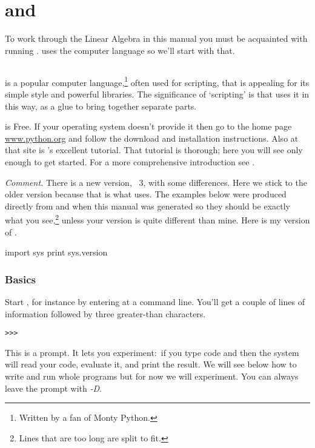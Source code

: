 \chapter{\python{} and \Sage{}}

To work through the Linear Algebra in this manual
you must be acquainted with running \Sage. 
\Sage{} uses the computer language \python{} so we'll start with that.


\section{\python}
\python{} is a popular computer language,\footnote{Written by a fan of
Monty Python.} often used for scripting,
that is appealing for its simple style and powerful libraries.
The significance of `scripting' is that \Sage{} uses it in this way,
as a glue to bring together separate parts.

\python{} is Free.
If your operating system doesn't provide it then go to the home 
page \href{http://www.python.org}{\url{www.python.org}} and follow the
download and installation instructions.
Also at that site is \python's excellent tutorial.
That tutorial is thorough; 
here you will see only enough \python{} to get started.
For a more comprehensive introduction see \cite{PythonTeam12b}.

\smallskip
\textit{Comment.}
There is a new version, \python~3, with some differences.
Here we stick to the older version 
because that is what \Sage{} uses.
The examples below were produced directly 
from \python{} and \Sage{} when this manual was generated so they should be 
exactly what you see,\footnote{Lines that are too long are split to fit.} 
unless your version is quite different than mine.
Here is my version of \python. 
\begin{pythonoutput}
import sys
print sys.version
\end{pythonoutput}

\subsection{Basics}
Start \python, for instance by entering 
at a command line.
You'll get a couple of lines of 
information followed by three greater-than
characters.
\begin{lstlisting}[style=python]
>>>   
\end{lstlisting}
This is a prompt.
It lets you experiment:~if you type 
\python{} code and  then the system
will read your code, evaluate it, and print the result.
We will see below how to write and run whole programs
but for now we will experiment.
You can always leave the prompt with \textit{-D}.

